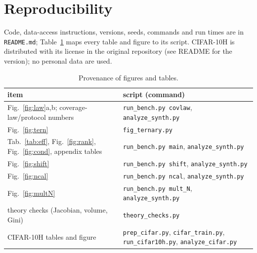 \documentclass{article}
\begin{document}
\section{Reproducibility}
Code, data-access instructions, versions, seeds, commands and run times are in \texttt{README.md}; Table~\ref{tab:map} maps every table and figure to its script. CIFAR-10H is distributed with its license in the original repository (see README for the version); no personal data are used.
\begin{table}[h]\centering\scriptsize
\caption{Provenance of figures and tables.}\label{tab:map}
\begin{tabular}{ll}\toprule item & script (command)\\\midrule
Fig.~\ref{fig:law}a,b; coverage-law/protocol numbers & \texttt{run\_bench.py covlaw}, \texttt{analyze\_synth.py}\\
Fig.~\ref{fig:tern} & \texttt{fig\_ternary.py}\\
Tab.~\ref{tab:eff}, Fig.~\ref{fig:rank}, Fig.~\ref{fig:cond}, appendix tables & \texttt{run\_bench.py main}, \texttt{analyze\_synth.py}\\
Fig.~\ref{fig:shift} & \texttt{run\_bench.py shift}, \texttt{analyze\_synth.py}\\
Fig.~\ref{fig:ncal} & \texttt{run\_bench.py ncal}, \texttt{analyze\_synth.py}\\
Fig.~\ref{fig:multN} & \texttt{run\_bench.py mult\_N}, \texttt{analyze\_synth.py}\\
theory checks (Jacobian, volume, Gini) & \texttt{theory\_checks.py}\\
CIFAR-10H tables and figure & \texttt{prep\_cifar.py}, \texttt{cifar\_train.py}, \texttt{run\_cifar10h.py}, \texttt{analyze\_cifar.py}\\\bottomrule
\end{tabular}\end{table}

\newpage

\end{document}

